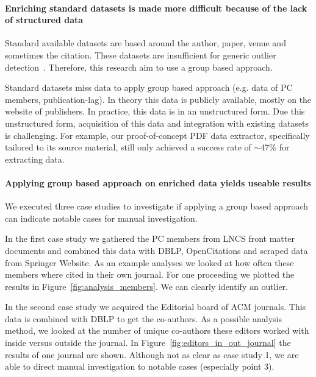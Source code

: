 \documentclass{ou-report}
\newcommand{\lncs}{LNCS}
\newcommand{\dblp}{DBLP}
\begin{document}
\paragraph{Enriching standard datasets is made more difficult because of the 
lack of structured data}
Standard available datasets are based around the author, paper, venue and 
sometimes the citation. These datasets are insufficient for generic outlier 
detection~\cite{TEJ2017}. Therefore, this research aim to use a group based 
approach.

Standard datasets miss data to apply group based approach (e.g. data of PC 
members, publication-lag). In theory this data is publicly available, mostly on 
the website of publishers. In practice, this data is in an unstructured form.
Due this unstructured form, acquisition of this data and integration with
existing datasets is challenging. For example, our proof-of-concept PDF data
extractor, specifically tailored to its source material, still only achieved
a success rate of $\sim$47\% for extracting data.


\paragraph{Applying group based approach on enriched data yields useable results}
We executed three case studies to investigate if applying a group based approach 
can indicate notable cases for manual investigation.

In the first case study we gathered the PC members from \lncs{} front matter 
documents and combined this data with \dblp{}, OpenCitations and scraped data 
from Springer Website. As an example analyses we looked at how often these 
members where cited in their own journal. For one proceeding we plotted the 
results in Figure~\ref{fig:analysis_members}. We can clearly identify an 
outlier.

In the second case study we acquired the Editorial board of ACM journals. This 
data is combined with \dblp{} to get the co-authors. As a possible analysis 
method, we looked at the number of unique co-authors these editors worked with 
inside versus outside the journal. In Figure~\ref{fig:editors_in_out_journal} 
the results of one journal are shown. Although not as clear as case study 1, we 
are able to direct manual investigation to notable cases (especially point 3).
\end{document}

